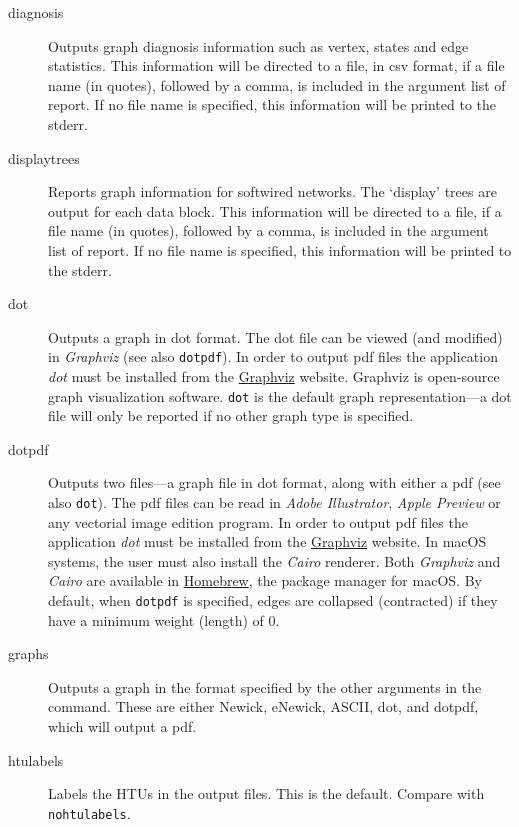 \begin{description}
		\item[diagnosis] Outputs graph diagnosis information such as vertex, states 
		and edge statistics. This information will be directed to a file, in csv format, if a 
		file name (in quotes), followed by a comma, is included in the argument list of 
		report. If no file name is specified, this information will be printed to the stderr.
		
		\item[displaytrees] Reports graph information for softwired networks. The 
		`display' trees are output for each data block. This information will be directed 
		to a file, if a file name (in quotes), followed by a comma, is included in the 
		argument list of report. If no file name is specified, this information 
		will be printed to the stderr.
		
		\item[dot] Outputs a graph in dot format. The dot file can be viewed (and 
		modified) in \textit{Graphviz} (see also \texttt{dotpdf}). In order to output pdf 
		files the application \textit{dot} must be installed from the 
		\href{https://graphviz.org/download/}{Graphviz} 	website. Graphviz is 
		open-source graph visualization software. \texttt{dot} is the default graph 
		representation---a dot file will only be reported if no other graph type is specified. 
		
		\item[dotpdf] Outputs two files---a graph file in dot format, along with either
		a pdf (see also \texttt{dot}). The pdf files can be read in \textit{Adobe Illustrator}, 
		\textit{Apple Preview} or any vectorial image edition program. In order to output 
		pdf files the application \textit{dot} must be installed from the
		\href{https://graphviz.org/download/}{Graphviz} website. In macOS systems, the 
		user must also install the \textit{Cairo} renderer. Both \textit{Graphviz} and 
		\textit{Cairo} are available in \href{https://brew.sh/}{Homebrew}, the package 
		manager for macOS. By default, when \texttt{dotpdf} is specified,
		edges are collapsed (contracted) if they have a minimum weight (length) of 0.
		
		\item[graphs] Outputs a graph in the format specified by the other arguments 
		in the command. These are either Newick, eNewick, ASCII, dot, and dotpdf, 
		which will output a pdf.
		
		\item[htulabels] Labels the HTUs in the output files. This is the default. Compare 
		with \texttt{nohtulabels}.
		

\end{description}
